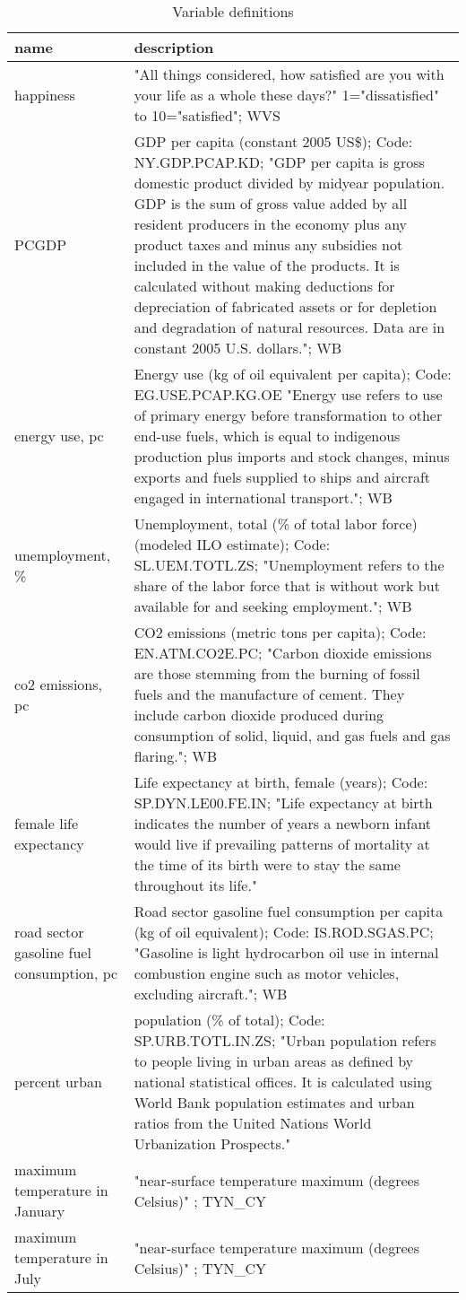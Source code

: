 \begin{table}[H]\centering\footnotesize
 \caption{\label{var_des} Variable definitions}
\begin{tabular} {p{1.5in}p{4.5in}}   \hline
name & description   \\ \hline
  happiness & "All things considered, how satisfied are you with your life as a whole these days?" 1="dissatisfied" to 10="satisfied"; WVS \\
  PCGDP & GDP per capita (constant 2005 US\$); Code: NY.GDP.PCAP.KD; "GDP per capita is gross domestic product divided by midyear population. GDP is the sum of gross value added by all resident producers in the economy plus any product taxes and minus any subsidies not included in the value of the products. It is calculated without making deductions for depreciation of fabricated assets or for depletion and degradation of natural resources. Data are in constant 2005 U.S. dollars."; WB \\
  energy use, pc & Energy use (kg of oil equivalent per capita); Code: EG.USE.PCAP.KG.OE "Energy use refers to use of primary energy before transformation to other end-use fuels, which is equal to indigenous production plus imports and stock changes, minus exports and fuels supplied to ships and aircraft engaged in international transport."; WB \\
  unemployment, \% & Unemployment, total (\% of total labor force) (modeled ILO estimate); Code: SL.UEM.TOTL.ZS; "Unemployment refers to the share of the labor force that is without work but available for and seeking employment."; WB \\
  co2 emissions, pc & CO2 emissions (metric tons per capita); Code: EN.ATM.CO2E.PC; "Carbon dioxide emissions are those stemming from the burning of fossil fuels and the manufacture of cement. They include carbon dioxide produced during consumption of solid, liquid, and gas fuels and gas flaring."; WB \\
  female life expectancy & Life expectancy at birth, female (years); Code: SP.DYN.LE00.FE.IN; "Life expectancy at birth indicates the number of years a newborn infant would live if prevailing patterns of mortality at the time of its birth were to stay the same throughout its life." \\
  road sector gasoline fuel consumption, pc & Road sector gasoline fuel consumption per capita (kg of oil equivalent); Code: IS.ROD.SGAS.PC; "Gasoline is light hydrocarbon oil use in internal combustion engine such as motor vehicles, excluding aircraft."; WB \\
  percent urban & population (\% of total); Code: SP.URB.TOTL.IN.ZS; "Urban population refers to people living in urban areas as defined by national statistical offices. It is calculated using World Bank population estimates and urban ratios from the United Nations World Urbanization Prospects." \\
  maximum temperature in January & "near-surface temperature maximum (degrees Celsius)" ; TYN\_CY \\
  maximum temperature in July & "near-surface temperature maximum (degrees Celsius)" ; TYN\_CY \\
\hline\end{tabular}\end{table}
